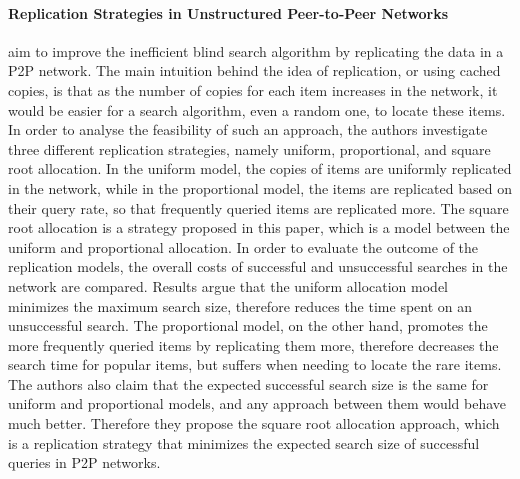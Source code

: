 \paragraph*{\bf Replication Strategies in Unstructured Peer-to-Peer Networks}
\cite{Cohen02} aim to improve the inefficient blind search algorithm by
replicating the data in a P2P network. The main intuition behind the
idea of replication, or using cached copies, is that as the number of copies for
each item increases in the network, it would be easier for a search algorithm,
even a random one, to locate these items. In order to analyse the feasibility of
such an approach, the authors investigate three different replication
strategies, namely uniform, proportional, and square root allocation. In the
uniform model, the copies of items are uniformly replicated in the network,
while in the proportional model, the items are replicated based on their query
rate, so that frequently queried items are replicated more. The square root
allocation is a strategy proposed in this paper, which is a model between the
uniform and proportional allocation.  In order to evaluate the outcome of the
replication models, the overall costs of successful and unsuccessful searches in
the network are compared. Results argue that the uniform allocation model
minimizes the maximum search size, therefore reduces the time spent on an
unsuccessful search. The proportional model, on the other hand, promotes the
more frequently queried items by replicating them more, therefore decreases the
search time for popular items, but suffers when needing to locate the rare
items. The authors also claim that the expected successful search size is the
same for uniform and proportional models, and any approach between them would
behave much better. Therefore they propose the square root allocation approach,
which is a replication strategy that minimizes the expected search size of
successful queries in P2P networks.

